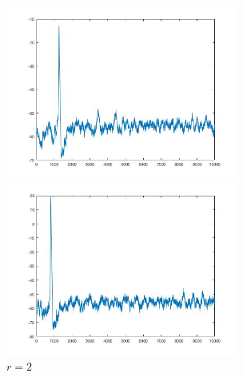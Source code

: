 \documentclass[
pdflinks,
]{xjtuthesis}
\begin{document}
\begin{figure}[!ht]
\begin{minipage}[!ht]{0.5\linewidth}
\centering
\includegraphics[width=3.0in]{figures/p10r1_2.jpg}
\caption{$r=1$}
\end{minipage}%
\begin{minipage}[!ht]{0.5\linewidth}
\centering
\includegraphics[width=3.0in]{figures/p10r2_2.jpg}
\caption{$r=2$}
\end{minipage}
\end{figure}

\xjtuendcontent



\xjtuappendix
\end{document}
